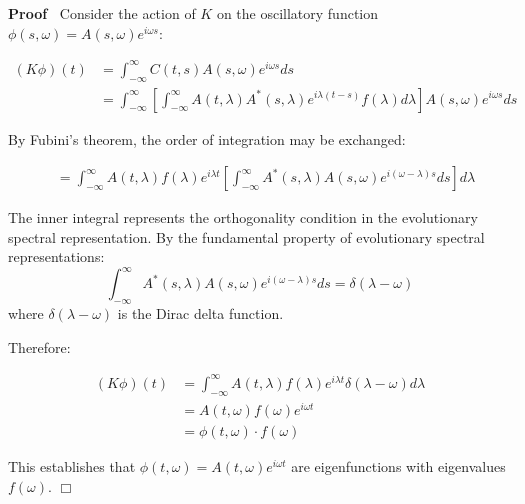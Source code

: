 \documentclass{article}
\newenvironment{proof}{\noindent\textbf{Proof\ }}{\hspace*{\fill}$\Box$\medskip}
\begin{document}
\begin{proof}
  Consider the action of $K$ on the oscillatory function $\phi (s, \omega) = A
  (s, \omega) e^{i \omega s}$:
  
  \begin{align}
    (K \phi) (t) & = \int_{- \infty}^{\infty} C (t, s) A (s, \omega) e^{i
    \omega s} ds \\
    & = \int_{- \infty}^{\infty} \left[ \int_{- \infty}^{\infty} A (t,
    \lambda) A^{\ast} (s, \lambda) e^{i \lambda (t - s)} f (\lambda) d \lambda \right] A (s, \omega)
    e^{i \omega s} ds 
  \end{align}
  
  By Fubini's theorem, the order of integration may be exchanged:
  
  \begin{align}
    & = \int_{- \infty}^{\infty} A (t, \lambda) f (\lambda) e^{i \lambda t} \left[ \int_{-
    \infty}^{\infty} A^{\ast} (s, \lambda) A (s, \omega) e^{i (\omega - \lambda) s} ds
    \right] d \lambda 
  \end{align}
  
  The inner integral represents the orthogonality condition in the
  evolutionary spectral representation. By the fundamental property of
  evolutionary spectral representations:
  \begin{equation}
    \int_{- \infty}^{\infty} A^{\ast} (s, \lambda) A (s, \omega) e^{i (\omega - \lambda)
    s} ds = \delta (\lambda - \omega)
  \end{equation}
  where $\delta (\lambda - \omega)$ is the Dirac delta function.
  
  Therefore:
  
  \begin{align}
    (K \phi) (t) & = \int_{- \infty}^{\infty} A (t, \lambda) f (\lambda) e^{i \lambda t}
    \delta (\lambda - \omega) d \lambda \\
    & = A (t, \omega) f (\omega) e^{i \omega t} \\
    & = \phi (t, \omega) \cdot f (\omega) 
  \end{align}
  
  This establishes that $\phi (t, \omega) = A (t, \omega) e^{i \omega t}$ are
  eigenfunctions with eigenvalues $f (\omega)$.
\end{proof}
\end{document}
